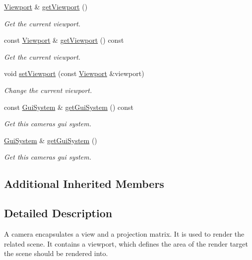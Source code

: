 \begin{DoxyCompactItemize}
\mbox{\hyperlink{classec_1_1_viewport}{Viewport}} \& \mbox{\hyperlink{classec_1_1_camera_a1f2f4a745112c095d17480959a70eb16}{get\+Viewport}} ()
\begin{DoxyCompactList}\small\item\em Get the current viewport. \end{DoxyCompactList}\item 
const \mbox{\hyperlink{classec_1_1_viewport}{Viewport}} \& \mbox{\hyperlink{classec_1_1_camera_adb2920a7a634aadcaca579eaf3fc1ad0}{get\+Viewport}} () const
\begin{DoxyCompactList}\small\item\em Get the current viewport. \end{DoxyCompactList}\item 
void \mbox{\hyperlink{classec_1_1_camera_a3fc6f03041f6c0ee897c9596039d424d}{set\+Viewport}} (const \mbox{\hyperlink{classec_1_1_viewport}{Viewport}} \&viewport)
\begin{DoxyCompactList}\small\item\em Change the current viewport. \end{DoxyCompactList}\item 
const \mbox{\hyperlink{classec_1_1_gui_system}{Gui\+System}} \& \mbox{\hyperlink{classec_1_1_camera_a96f6414127f336eb9079ad30df80d1a7}{get\+Gui\+System}} () const
\begin{DoxyCompactList}\small\item\em Get this camera\textquotesingle{}s gui system. \end{DoxyCompactList}\item 
\mbox{\hyperlink{classec_1_1_gui_system}{Gui\+System}} \& \mbox{\hyperlink{classec_1_1_camera_a3af91683c492e0094127f169a4927945}{get\+Gui\+System}} ()
\begin{DoxyCompactList}\small\item\em Get this camera\textquotesingle{}s gui system. \end{DoxyCompactList}\end{DoxyCompactItemize}
\subsection*{Additional Inherited Members}


\subsection{Detailed Description}
A camera encapsulates a view and a projection matrix. It is used to render the related scene. It contains a viewport, which defines the area of the render target the scene should be rendered into. 

